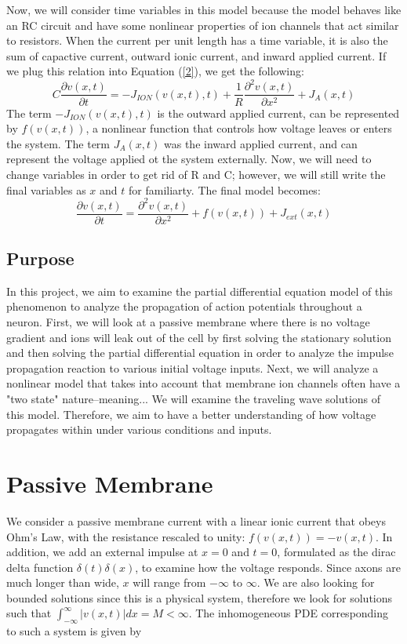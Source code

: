 \documentclass[12pt]{article}
\begin{document}
Now, we will consider time variables in this model because the model behaves like an RC circuit and have some nonlinear properties of ion channels that act similar to resistors. When the current per unit length has a time variable, it is also the sum of capactive current, outward ionic current, and inward applied current. If we plug this relation into Equation (\ref{2}), we get the following:
\[C\frac{\partial{v(x,t)}}{\partial{t}}=-J_{ION}(v(x,t),t)+\frac{1}{R}\frac{\partial^2{v(x,t)}}{\partial{x}^2}+J_A(x,t)\]
The term $-J_{ION}(v(x,t),t)$ is the outward applied current, can be represented by $f(v(x,t))$, a nonlinear function that controls how voltage leaves or enters the system. The term $J_A(x,t)$ was the inward applied current, and can represent the voltage applied ot the system externally. Now, we will need to change variables in order to get rid of R and C; however, we will still write the final variables as $x$ and $t$ for familiarty. The final model becomes:
\[\frac{\partial{v(x,t)}}{\partial{t}}=\frac{\partial^2{v(x,t)}}{\partial{x}^2}+f(v(x,t))+J_{ext}(x,t)\]

\subsection{Purpose}
In this project, we aim to examine the partial differential equation model of this phenomenon to analyze the propagation of action potentials throughout a neuron. First, we will look at a passive membrane where there is no voltage gradient and ions will leak out of the cell by first solving the stationary solution and then solving the partial differential equation in order to analyze the impulse propagation reaction to various initial voltage inputs. Next, we will analyze a nonlinear model that takes into account that membrane ion channels often have a "two state" nature--meaning... We will examine the traveling wave solutions of this model. Therefore, we aim to have a better understanding of how voltage propagates within under various conditions and inputs.

\section{Passive Membrane}
We consider a passive membrane current with a linear ionic current that obeys Ohm's Law, with the resistance rescaled to unity: $f(v(x,t)) = -v(x,t)$. In addition, we add an external impulse at $x=0$ and $t=0$, formulated as the dirac delta function $\delta(t) \delta(x)$, to examine how the voltage responds. Since axons are much longer than wide, $x$ will range from $-\infty$ to $\infty$. We are also looking for bounded solutions since this is a physical system, therefore we look for solutions such that $\int_{-\infty}^{\infty}|v(x,t)|dx = M < \infty$. The inhomogeneous PDE corresponding to such a system is given by
\end{document}
